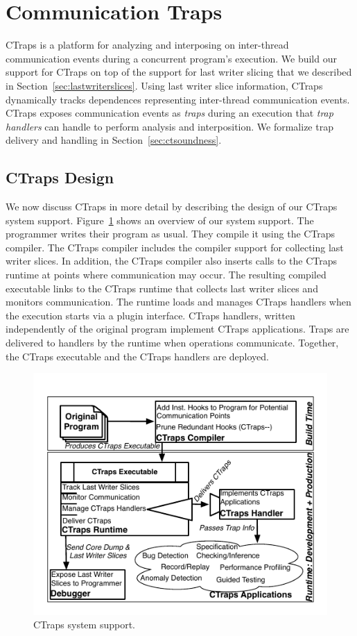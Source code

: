 \documentclass[preprint,9pt]{sigplanconf}
\newcommand{\ctraps}{CTraps\xspace}
\begin{document}
\section{Communication Traps}
\label{sec:ctraps}

\ctraps is a platform for analyzing and interposing on inter-thread
communication events during a concurrent program's execution.  We build our
support for \ctraps on top of the support for last writer slicing that we
described in Section~\ref{sec:lastwriterslices}.  Using last writer slice
information, \ctraps dynamically tracks dependences representing inter-thread
communication events. \ctraps exposes communication events as {\em traps}
during an execution that {\em trap handlers} can handle to perform analysis
and interposition.  We formalize trap delivery and handling in
Section~\ref{sec:ctsoundness}.

\subsection{\ctraps Design}

We now discuss \ctraps in more detail by describing the design of our \ctraps
system support.  Figure~\ref{fig:systemdiagram} shows an overview of our system
support.  The programmer writes their program as usual.  They compile it using
the \ctraps compiler. The \ctraps compiler includes the compiler support for
collecting last writer slices.  In addition, the \ctraps compiler also inserts
calls to the \ctraps runtime at points where communication may occur.  The
resulting compiled executable links to the \ctraps runtime that collects last
writer slices and monitors communication.  The runtime loads and manages \ctraps
handlers when the execution starts via a plugin interface.  \ctraps handlers,
written independently of the original program implement \ctraps applications.
Traps are delivered to handlers by the runtime when operations communicate.
Together, the \ctraps executable and the \ctraps handlers are deployed.


\begin{figure}[htb]
\centering
\includegraphics[width=.90\columnwidth]{figs/SystemDiagram.pdf}
\caption{\label{fig:systemdiagram}CTraps system support.}
\end{figure}
\end{document}
